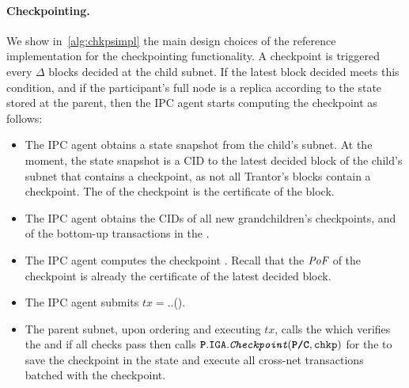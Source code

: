\paragraph{Checkpointing.} We show in~\cref{alg:chkpsimpl} the main design choices of the reference implementation for the checkpointing functionality. A checkpoint is triggered every $\Delta$ blocks decided at the child subnet. If the latest block decided meets this condition, and if the participant's full node is a replica according to the state stored at the parent, then the IPC agent starts computing the checkpoint as follows:
\begin{itemize}
    \item The IPC agent obtains a state snapshot from the child's subnet. At the moment, the state snapshot is a CID to the latest decided block of the child's subnet that contains a checkpoint, as not all Trantor's blocks contain a checkpoint. The \pof of the checkpoint is the certificate of the block.
    \item The IPC agent obtains the CIDs of all new grandchildren's checkpoints, and of the bottom-up transactions in the \bqueue.
    \item The IPC agent computes the checkpoint . Recall that the $\textit{PoF}$ of the checkpoint is already the certificate of the latest decided block.
    \item The IPC agent submits $tx=$..().
    \item The parent subnet, upon ordering and executing $tx$, calls the \sa which verifies the \pof and if all checks pass then calls $\textbf{\texttt{P}}.\texttt{IGA}.\textit{\texttt{Checkpoint}}(\textbf{\texttt{P/C}},\texttt{chkp})$ for the \gw to save the checkpoint in the state and execute all cross-net transactions batched with the checkpoint.
\end{itemize}
\\
